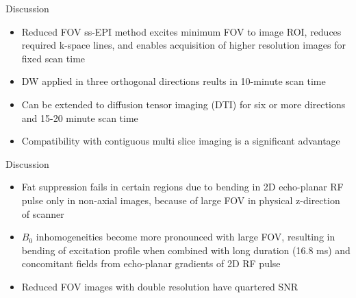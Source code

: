 \documentclass{beamer}
\begin{document}
\begin{frame}{Discussion}
\begin{itemize}
	\item Reduced FOV ss-EPI method excites minimum FOV to image ROI, reduces required k-space lines, and enables acquisition of higher resolution images for fixed scan time
	\item DW applied in three orthogonal directions reults in 10-minute scan time
	\item Can be extended to diffusion tensor imaging (DTI) for six or more directions and 15-20 minute scan time
	\item Compatibility with contiguous multi slice imaging is a significant advantage
\end{itemize}
\end{frame}

\begin{frame}{Discussion}
\begin{itemize}
	\item Fat suppression fails in certain regions due to bending in 2D echo-planar RF pulse only in non-axial images, because of large FOV in physical z-direction of scanner
	\item $B_0$ inhomogeneities become more pronounced with large FOV, resulting in bending of excitation profile when combined with long duration (16.8 ms) and concomitant fields from echo-planar gradients of 2D RF pulse
	\item Reduced FOV images with double resolution have quartered SNR
\end{itemize}
\end{frame}

%
%
%
\end{document}
